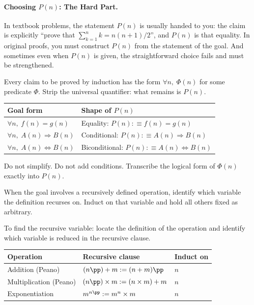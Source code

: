 \paragraph{Choosing $P(n)$: The Hard Part.}
\label{sec:choosing-pn}

In textbook problems, the statement $P(n)$ is usually handed to you:
the claim is explicitly ``prove that $\sum_{k=1}^n k = n(n+1)/2$'',
and $P(n)$ is that equality. In original proofs, you must construct
$P(n)$ from the statement of the goal. And sometimes even when $P(n)$
is given, the straightforward choice fails and must be strengthened.

\begin{remark}
Every claim to be proved by induction has the form $\forall n,\; \Phi(n)$
for some predicate $\Phi$. Strip the universal quantifier:
what remains is $P(n)$.

\medskip
\noindent
\begin{tabular}{ll}
\toprule
\textbf{Goal form} & \textbf{Shape of $P(n)$} \\
\midrule
$\forall n,\; f(n) = g(n)$ & Equality: $P(n) :\equiv f(n) = g(n)$ \\[4pt]
$\forall n,\; A(n) \Rightarrow B(n)$ & Conditional: $P(n) :\equiv A(n) \Rightarrow B(n)$ \\[4pt]
$\forall n,\; A(n) \Leftrightarrow B(n)$ & Biconditional: $P(n) :\equiv A(n) \Leftrightarrow B(n)$ \\
\bottomrule
\end{tabular}

\medskip
\noindent
Do not simplify. Do not add conditions. Transcribe the logical form
of $\Phi(n)$ exactly into $P(n)$.
\end{remark}

\begin{remark}
When the goal involves a recursively defined operation, identify which
variable the definition recurses on. Induct on that variable and hold
all others fixed as arbitrary.

To find the recursive variable: locate the definition of the operation
and identify which variable is reduced in the recursive clause.

\medskip
\noindent
\begin{tabular}{lll}
\toprule
\textbf{Operation} & \textbf{Recursive clause} & \textbf{Induct on} \\
\midrule
Addition (Peano) & $(n\pp) + m := (n + m)\pp$ & $n$ \\[4pt]
Multiplication (Peano) & $(n\pp) \times m := (n \times m) + m$ & $n$ \\[4pt]
Exponentiation & $m^{n\pp} := m^n \times m$ & $n$ \\
\bottomrule
\end{tabular}
\end{remark}


